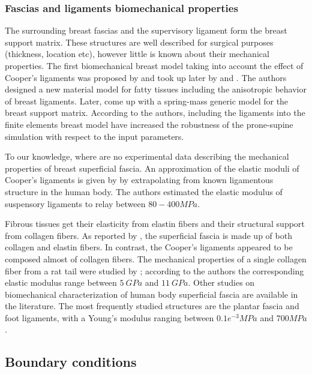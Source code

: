 \subsubsection*{Fascias and ligaments biomechanical properties}
The surrounding breast fascias and the supervisory ligament form the breast support matrix. These structures are well described for surgical purposes (thickness, location etc), however little is known about their mechanical properties. The first biomechanical breast model taking into account the effect of Cooper's ligaments was proposed by \cite{azar_methods_2002} and took up later by \cite{pathmanathan_predicting_2008} and \cite{han_development_2012}. The authors designed a new material model for fatty tissues including the anisotropic behavior of breast ligaments. Later, \cite{georgii_simulation_2016} come up with a spring-mass generic model for the breast support matrix. According to the authors, including the ligaments into the finite elements breast model have increased the robustness of the prone-supine simulation with respect to the input parameters. 

 To our knowledge, where are no experimental data describing the mechanical properties of breast superficial fascia. An approximation of the elastic moduli of Cooper's ligaments is given by \cite{gefen_mechanics_2007} by extrapolating from known ligamentous structure in the human body. The authors estimated the elastic modulus of suspensory ligaments to relay between $80 - 400 MPa$.
 
 Fibrous tissues get their elasticity from elastin  fibers and their structural support from collagen fibers. As reported by \cite{riggio_anatomical_2000}, the superficial fascia is made up of both collagen and elastin fibers. In contrast, the Cooper's ligaments appeared to be composed almost of collagen fibers.  The mechanical properties of a single collagen fiber from a rat tail were studied by \cite{wenger_mechanical_2007}; according to the authors the corresponding elastic modulus range between $5\ GPa$ and $11\ GPa$. Other studies on biomechanical characterization of human body superficial fascia are available in the literature. The most frequently studied structures are the plantar fascia and foot ligaments, with a Young's modulus ranging between $0.1e^{-3} MPa$ \citep{gefen_vivo_2003} and $700 MPa $ \citep{cheung_effects_2004}. 

\subsection{Boundary conditions}

